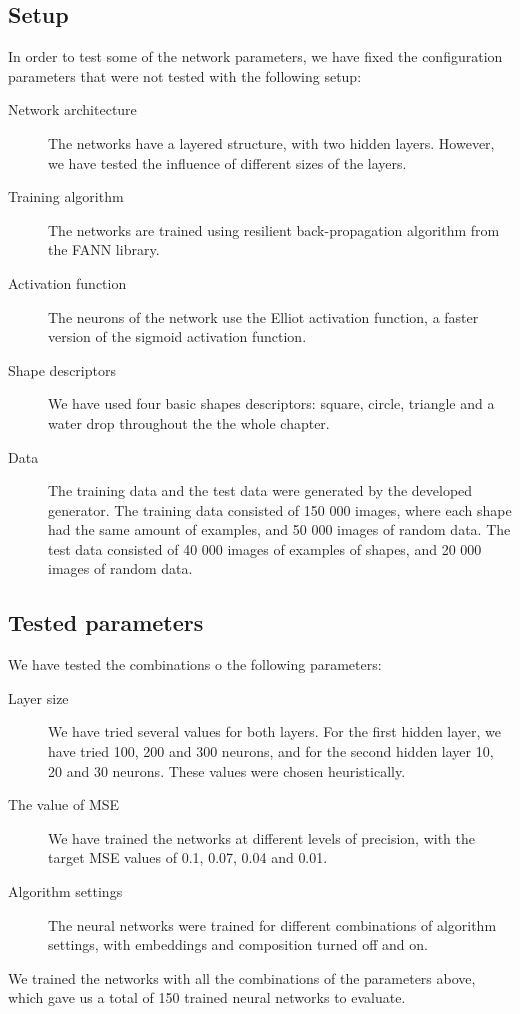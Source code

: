 \subsection{Setup}
In order to test some of the network parameters, we have fixed the configuration parameters that were not tested with the following setup:
\begin{description}
\item [Network architecture] The  networks have a layered structure, with two hidden layers. However, we have tested the influence of different sizes of the layers.
\item [Training algorithm] The networks are trained using resilient back-propagation algorithm from the FANN library.
\item [Activation function] The neurons of the network use the Elliot activation function, a faster version of the sigmoid activation function.
\item [Shape descriptors] We have used four basic shapes descriptors: square, circle, triangle and a water drop throughout the the whole chapter. 
\item [Data] The training data and the test data were generated by the developed generator. The training data consisted of 150 000 images, where each shape had the same amount of examples, and 50 000 images of random data. The test data consisted of 40 000 images of examples of shapes, and 20 000 images of random data.
\end{description}

\subsection{Tested parameters}
We have tested the combinations o the following parameters:
\begin{description}
\item [Layer size] We have tried several values for both layers. For the first hidden layer, we have tried 100, 200 and 300 neurons, and for the second hidden layer 10, 20 and 30 neurons. These values were chosen heuristically.
\item [The value of MSE] We have trained the networks at different levels of precision, with the target MSE values of 0.1, 0.07, 0.04 and 0.01.
\item [Algorithm settings] The neural networks were trained for different combinations of algorithm settings, with embeddings and composition turned off and on.
\end{description}
We trained the networks with all the combinations of the parameters above, which gave us a total of 150 trained neural networks to evaluate.


